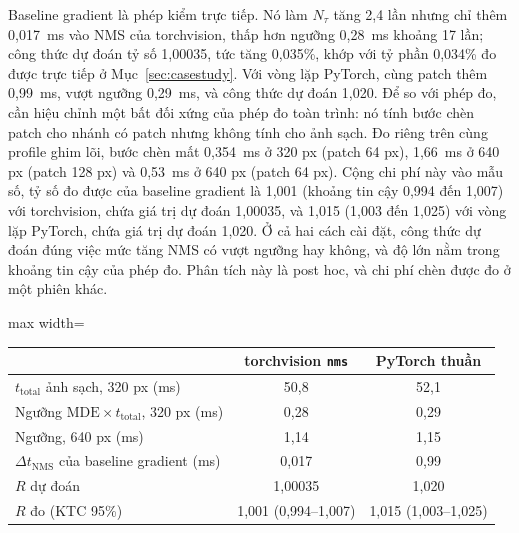 \documentclass[a4paper,fleqn]{cas-dc}
\newcommand{\Ntau}{N_{\tau}}
\begin{document}
Baseline gradient là phép kiểm trực tiếp. Nó làm $\Ntau$ tăng 2,4 lần nhưng chỉ thêm 0,017~ms vào NMS của torchvision, thấp hơn ngưỡng 0,28~ms khoảng 17 lần; công thức dự đoán tỷ số 1,00035, tức tăng 0,035\%, khớp với tỷ phần 0,034\% đo được trực tiếp ở Mục~\ref{sec:casestudy}. Với vòng lặp PyTorch, cùng patch thêm 0,99~ms, vượt ngưỡng 0,29~ms, và công thức dự đoán 1,020. Để so với phép đo, cần hiệu chỉnh một bất đối xứng của phép đo toàn trình: nó tính bước chèn patch cho nhánh có patch nhưng không tính cho ảnh sạch. Đo riêng trên cùng profile ghim lõi, bước chèn mất 0,354~ms ở 320 px (patch 64 px), 1,66~ms ở 640 px (patch 128 px) và 0,53~ms ở 640 px (patch 64 px). Cộng chi phí này vào mẫu số, tỷ số đo được của baseline gradient là 1,001 (khoảng tin cậy 0,994 đến 1,007) với torchvision, chứa giá trị dự đoán 1,00035, và 1,015 (1,003 đến 1,025) với vòng lặp PyTorch, chứa giá trị dự đoán 1,020. Ở cả hai cách cài đặt, công thức dự đoán đúng việc mức tăng NMS có vượt ngưỡng hay không, và độ lớn nằm trong khoảng tin cậy của phép đo. Phân tích này là post hoc, và chi phí chèn được đo ở một phiên khác.

\par\begin{center}
\centering\small
{}
\label{tab:threshold}
\begin{adjustbox}{max width=\columnwidth}
\begin{tabular}{@{}lcc@{}}
\toprule
 & torchvision \texttt{nms} & PyTorch thuần \\
\midrule
$t_{\mathrm{total}}$ ảnh sạch, 320 px (ms) & 50,8 & 52,1 \\
Ngưỡng $\mathrm{MDE}\times t_{\mathrm{total}}$, 320 px (ms) & 0,28 & 0,29 \\
Ngưỡng, 640 px (ms) & 1,14 & 1,15 \\
$\Delta t_{\mathrm{NMS}}$ của baseline gradient (ms) & 0,017 & 0,99 \\
$R$ dự đoán & 1,00035 & 1,020 \\
$R$ đo (KTC 95\%) & 1,001 (0,994--1,007) & 1,015 (1,003--1,025) \\
\bottomrule
\end{tabular}
\end{adjustbox}
\end{center}\par
\end{document}
